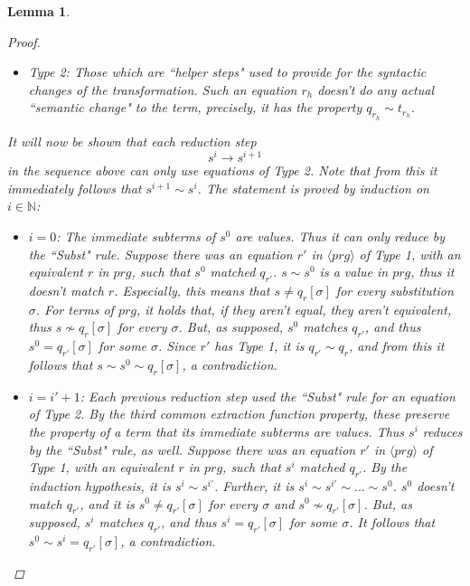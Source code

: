 \documentclass[11pt]{article} %
\newtheorem{lemma}{Lemma}
\begin{document}
\begin{lemma}
\begin{proof}
\begin{itemize}
\item Type 2: Those which are ``helper steps" used to provide for the syntactic changes of the transformation. Such an equation $r_h$ doesn't do any actual ``semantic change" to the term, precisely, it has the property $q_{r_h} \sim t_{r_h}$.
\end{itemize}
It will now be shown that each reduction step
\begin{equation*}
s^i \longrightarrow s^{i+1}
\end{equation*}
in the sequence above can only use equations of Type 2. Note that from this it immediately follows that $s^{i+1} \sim s^i$. The statement is proved by induction on $i \in \mathbb{N}$:
\begin{itemize}
\item $i = 0$: The immediate subterms of $s^0$ are values. Thus it can only reduce by the ``Subst" rule. Suppose there was an equation $r'$ in $\langle prg \rangle$ of Type 1, with an equivalent $r$ in $prg$, such that $s^0$ matched $q_{r'}$. $s \sim s^0$ is a value in $prg$, thus it doesn't match $r$. Especially, this means that $s \neq q_r[\sigma]$ for \textit{every} substitution $\sigma$. For terms of $prg$, it holds that, if they aren't equal, they aren't equivalent, thus $s \not\sim q_r[\sigma]$ for every $\sigma$. But, as supposed, $s^0$ matches $q_{r'}$, and thus $s^0 = q_{r'}[\sigma]$ for some $\sigma$. Since $r'$ has Type 1, it is $q_{r'} \sim q_r$, and from this it follows that $s \sim s^0 \sim q_r[\sigma]$, a contradiction.

\item $i = i' + 1$: Each previous reduction step used the ``Subst" rule for an equation of Type 2. By the third common extraction function property, these preserve the property of a term that its immediate subterms are values. Thus $s^i$ reduces by the ``Subst" rule, as well. Suppose there was an equation $r'$ in $\langle prg \rangle$ of Type 1, with an equivalent $r$ in $prg$, such that $s^i$ matched $q_{r'}$.
By the induction hypothesis, it is $s^{i} \sim s^{i'}$. Further, it is $s^i \sim s^{i'} \sim ... \sim s^0$. $s^0$ doesn't match $q_{r'}$, and it is $s^0 \neq q_{r'}[\sigma]$ for every $\sigma$ and $s^0 \not\sim q_{r'}[\sigma]$. But, as supposed, $s^i$ matches $q_{r'}$, and thus $s^i = q_{r'}[\sigma]$ for some $\sigma$. It follows that $s^0 \sim s^i = q_{r'}[\sigma]$, a contradiction.

\end{itemize}


\end{proof}
\end{lemma}
\end{document}
